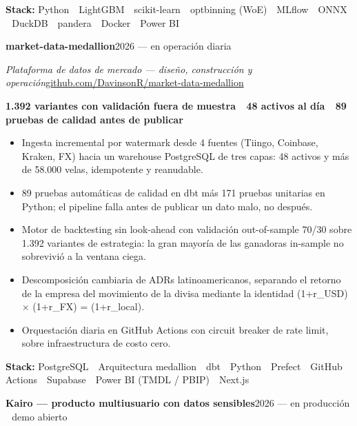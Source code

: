 \documentclass[a4paper,10pt]{article}
\newcommand{\headline}[2]{\needspace{3\baselineskip}\textbf{\color{ink}#1}\hfill{\small #2}\par}
\newcommand{\subline}[2]{\textit{#1}\hfill{\small #2}\par}
\begin{document}
{\small\textbf{Stack:} Python \,\textperiodcentered\, LightGBM \,\textperiodcentered\, scikit-learn \,\textperiodcentered\, optbinning (WoE) \,\textperiodcentered\, MLflow \,\textperiodcentered\, ONNX \,\textperiodcentered\, DuckDB \,\textperiodcentered\, pandera \,\textperiodcentered\, Docker \,\textperiodcentered\, Power BI}\par
\vspace{4pt}
\headline{market-data-medallion}{2026 --- en operación diaria}
\subline{Plataforma de datos de mercado --- diseño, construcción y operación}{\href{https://github.com/DavinsonR/market-data-medallion}{github.com/DavinsonR/market-data-medallion}}
{\small\bfseries\color{cold} 1.392 variantes con validación fuera de muestra \,\textperiodcentered\, 48 activos al día \,\textperiodcentered\, 89 pruebas de calidad antes de publicar}\par
\begin{itemize}[leftmargin=1.1em, itemsep=0pt, topsep=1pt, parsep=0pt]
  \item Ingesta incremental por watermark desde 4 fuentes (Tiingo, Coinbase, Kraken, FX) hacia un warehouse PostgreSQL de tres capas: 48 activos y más de 58.000 velas, idempotente y reanudable.
  \item 89 pruebas automáticas de calidad en dbt más 171 pruebas unitarias en Python; el pipeline falla antes de publicar un dato malo, no después.
  \item Motor de backtesting sin look-ahead con validación out-of-sample 70/30 sobre 1.392 variantes de estrategia: la gran mayoría de las ganadoras in-sample no sobrevivió a la ventana ciega.
  \item Descomposición cambiaria de ADRs latinoamericanos, separando el retorno de la empresa del movimiento de la divisa mediante la identidad (1+r\_USD) $\times$ (1+r\_FX) = (1+r\_local).
  \item Orquestación diaria en GitHub Actions con circuit breaker de rate limit, sobre infraestructura de costo cero.
\end{itemize}
{\small\textbf{Stack:} PostgreSQL \,\textperiodcentered\, Arquitectura medallion \,\textperiodcentered\, dbt \,\textperiodcentered\, Python \,\textperiodcentered\, Prefect \,\textperiodcentered\, GitHub Actions \,\textperiodcentered\, Supabase \,\textperiodcentered\, Power BI (TMDL / PBIP) \,\textperiodcentered\, Next.js}\par
\vspace{4pt}
\headline{Kairo --- producto multiusuario con datos sensibles}{2026 --- en producción \,\textperiodcentered\, demo abierto}
\end{document}
